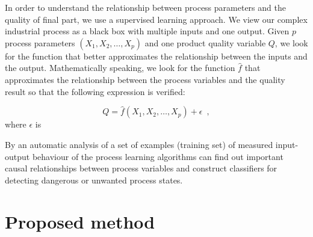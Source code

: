 In order to understand the relationship between process parameters and the quality of final part, we use a supervised learning approach. We view our complex industrial process as a black box with multiple inputs and one output. Given $p$ process parameters $(X_1,X_2,\ldots,X_p)$ and one product quality variable $Q$, we look for the function that better approximates the relationship between the inputs and the output. Mathematically speaking, we look for the function $\hat{f}$ that approximates the relationship between the process variables and the quality result so that the following expression is verified:

\begin{equation}
    Q = \hat{f}(X_1,X_2,\ldots,X_p) + \epsilon
    \enspace,
\end{equation}
where $\epsilon$ is

By an automatic analysis of a set of examples (training set) of measured input-output behaviour of the process learning algorithms can find out important causal relationships between process variables and construct classifiers for detecting dangerous or unwanted process states.


\section{Proposed method} \label{Proposed Method}

